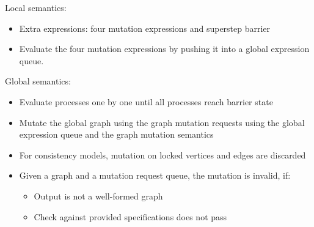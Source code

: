 \begin{frame}
Local semantics:\\
\begin{itemize}
  \item Extra expressions: four mutation expressions and superstep barrier
  \item Evaluate the four mutation expressions by pushing it into a global
  expression queue.
\end{itemize}
\end{frame}

\begin{frame}
Global semantics:\\
\begin{itemize}
  \item Evaluate processes one by one until all processes reach barrier state
  \item Mutate the global graph using the graph mutation requests using the
  global expression queue and the graph mutation semantics
  \item For consistency models, mutation on locked vertices and edges are
  discarded
  \item Given a graph and a mutation request queue, the mutation is invalid, if:
  \begin{itemize}
    \item Output is not a well-formed graph
    \item Check against provided specifications does not pass 
  \end{itemize}
\end{itemize}
\end{frame}
